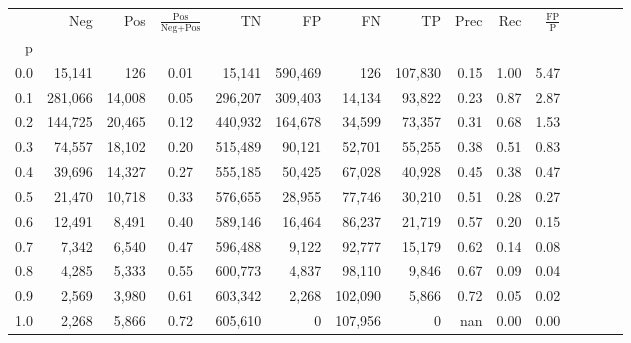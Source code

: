 \begin{tabular}{rrrcrrrrrrrrrrr}
\toprule
{} &      Neg &     Pos & $\frac{\text{Pos}}{\text{Neg}+\text{Pos}}$ &       TN &       FP &       FN &       TP &  Prec &   Rec & $\frac{\text{FP}}{\text{P}}$ \\
p   &          &         &                                            &          &          &          &          &       &       &                              \\
\midrule
0.0 &   15,141 &     126 &                                       0.01 &   15,141 &  590,469 &      126 &  107,830 &  0.15 &  1.00 &                         5.47 \\
0.1 &  281,066 &  14,008 &                                       0.05 &  296,207 &  309,403 &   14,134 &   93,822 &  0.23 &  0.87 &                         2.87 \\
0.2 &  144,725 &  20,465 &                                       0.12 &  440,932 &  164,678 &   34,599 &   73,357 &  0.31 &  0.68 &                         1.53 \\
0.3 &   74,557 &  18,102 &                                       0.20 &  515,489 &   90,121 &   52,701 &   55,255 &  0.38 &  0.51 &                         0.83 \\
0.4 &   39,696 &  14,327 &                                       0.27 &  555,185 &   50,425 &   67,028 &   40,928 &  0.45 &  0.38 &                         0.47 \\
0.5 &   21,470 &  10,718 &                                       0.33 &  576,655 &   28,955 &   77,746 &   30,210 &  0.51 &  0.28 &                         0.27 \\
0.6 &   12,491 &   8,491 &                                       0.40 &  589,146 &   16,464 &   86,237 &   21,719 &  0.57 &  0.20 &                         0.15 \\
0.7 &    7,342 &   6,540 &                                       0.47 &  596,488 &    9,122 &   92,777 &   15,179 &  0.62 &  0.14 &                         0.08 \\
0.8 &    4,285 &   5,333 &                                       0.55 &  600,773 &    4,837 &   98,110 &    9,846 &  0.67 &  0.09 &                         0.04 \\
0.9 &    2,569 &   3,980 &                                       0.61 &  603,342 &    2,268 &  102,090 &    5,866 &  0.72 &  0.05 &                         0.02 \\
1.0 &    2,268 &   5,866 &                                       0.72 &  605,610 &        0 &  107,956 &        0 &   nan &  0.00 &                         0.00 \\
\bottomrule
\end{tabular}
